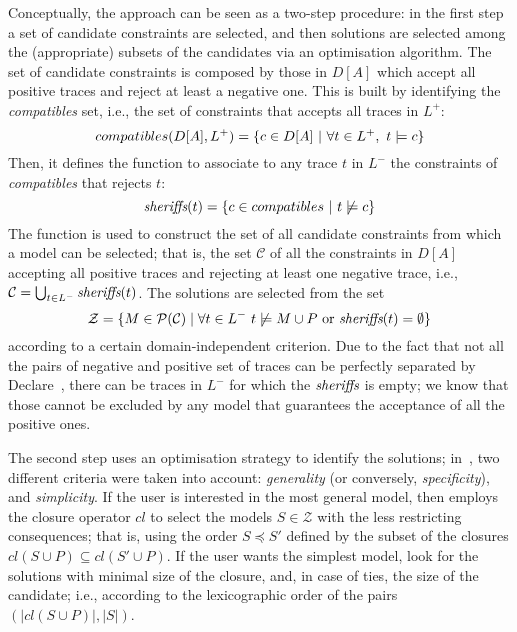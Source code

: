 Conceptually, the \nd approach can be seen as a two-step procedure: in the first step a set of candidate constraints are selected, and then solutions are selected among the (appropriate) subsets of the candidates via an optimisation algorithm.
%
The set of candidate constraints is composed by those in $D[A]$ which accept all positive traces and reject at least a negative one. This is built by identifying the \emph{compatibles} set, i.e., the set of constraints that accepts all traces in $L^+$: 
\begin{equation}
{compatibles(D[A], L^+)} = \{c\in D[A]~|~\forall t\in L^+,~ t\models c \} \\
\end{equation}
%
Then, it defines the \textit{\sheriff} function to associate to any trace $t$ in $L^-$ the constraints of \textit{compatibles} that rejects $t$:
\begin{equation}
{\textit{sheriffs}}(t) = \{c\in {compatibles}~|~t\not\models c\} \\
\end{equation}
%
The \textit{\sheriff} function is used to construct the set of all candidate constraints from which a model can be selected; that is, the set $\mathcal{C}$ of all the constraints in $D[A]$ accepting all positive traces and rejecting at least one negative trace, i.e., $\mathcal{C} = \bigcup_{t\in L^-} \textit{sheriffs}(t)$. The solutions are selected from the set 
\begin{equation}
  \mathcal{Z}=\{M\in\mathcal{P}(\mathcal{C})\mid \forall t\in L^-~t\not\models M\cup P \text{ or } {\textit{sheriffs}}(t) = \emptyset \}
\end{equation}
according to a certain domain-independent criterion. Due to the fact that not all the pairs of negative and positive set of traces can be perfectly separated by Declare~\cite{???}, there can be traces in $L^-$ for which the ${\textit{sheriffs}}$ is empty; we know that those cannot be excluded by any model that guarantees the acceptance of all the positive ones.

The second step uses an optimisation strategy to identify the solutions; in~\cite{deviant-tkde}, two different criteria were taken into account: \emph{generality} (or conversely, \emph{specificity}), and \emph{simplicity}.
If the user is interested in the most general model, then \nd employs the closure operator $cl$ to select the models $S \in \mathcal{Z}$ with the less restricting consequences; that is, using the order $S\preceq S'$ defined by the subset of the closures $cl(S\cup P)\subseteq cl(S'\cup P)$.
If the user wants the simplest model, \nd look for the solutions with minimal size of the closure, and, in case of ties, the size of the candidate; i.e., according to the lexicographic order of the pairs $(|cl(S\cup P)|, |S|)$.



